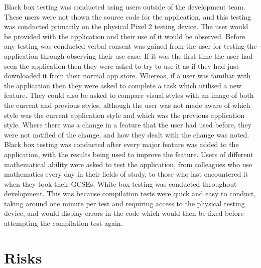 \documentclass{article}
\begin{document}
Black box testing was conducted using users outside of the development team. These users were not shown the source code for the application, and this testing was conducted primarily on the physical Pixel 2 testing device. The user would be provided with the application and their use of it would be observed. Before any testing was conducted verbal consent was gained from the user for testing the application through observing their use case. If it was the first time the user had seen the application then they were asked to try to use it as if they had just downloaded it from their normal app store. Whereas, if a user was familiar with the application then they were asked to complete a task which utilised a new feature. They could also be asked to compare visual styles with an image of both the current and previous styles, although the user was not made aware of which style was the current application style and which was the previous application style. Where there was a change in a feature that the user had used before, they were not notified of the change, and how they dealt with the change was noted. \\

Black box testing was conducted after every major feature was added to the application, with the results being used to improve the feature. Users of different mathematical ability were asked to test the application, from colleagues who use mathematics every day in their fields of study, to those who last encountered it when they took their GCSEs. White box testing was conducted throughout development. This was because compilation tests were quick and easy to conduct, taking around one minute per test and requiring access to the physical testing device, and would display errors in the code which would then be fixed before attempting the compilation test again. \\

\section{Risks}
\label{section:risks}
\end{document}
